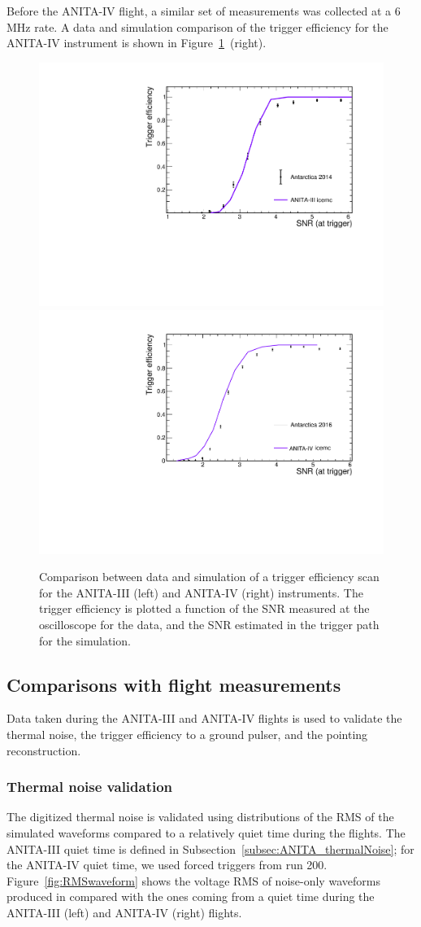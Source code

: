 Before the ANITA-IV flight, a similar set of measurements was collected at a 6\,MHz rate. 
A data and simulation comparison of the trigger efficiency for the ANITA-IV instrument is shown in Figure~\ref{fig:scans}~(right).

\begin{figure}[!h]\centering
  \includegraphics[width=.45\linewidth]{./Figs/EfficiencyScanNoDelaysA3_efficiencyVSsnrTrigger.pdf}
    \includegraphics[width=.45\linewidth]{./Figs/EfficiencyScanNoDelaysA4_efficiencyVSsnrTrigger.pdf}
  \caption{Comparison between data and simulation of a trigger efficiency scan for the ANITA-III (left) and ANITA-IV (right) instruments. 
    The trigger efficiency is plotted a function of the SNR
    measured at the oscilloscope for the data, and the SNR estimated in the trigger path for the simulation. 
    }
  \label{fig:scans}
\end{figure}


\subsection{Comparisons with flight measurements}
\label{subsec:validation_flight}
Data taken during the ANITA-III and ANITA-IV flights is used to validate 
the thermal noise, the trigger efficiency to a ground pulser, and the pointing reconstruction.

\subsubsection{Thermal noise validation}
\label{subsec:ANITA_validation_thermalNoise}
The digitized thermal noise is validated using distributions of
the RMS of the simulated waveforms compared to a relatively quiet time
during the flights.
The ANITA-III quiet time is defined in Subsection~\ref{subsec:ANITA_thermalNoise}; for the ANITA-IV quiet time, we used forced triggers from run 200.
Figure~\ref{fig:RMSwaveform} shows the voltage RMS of noise-only waveforms produced
in \icemc compared with the ones coming from a quiet time during
the ANITA-III (left) and ANITA-IV (right) flights.

